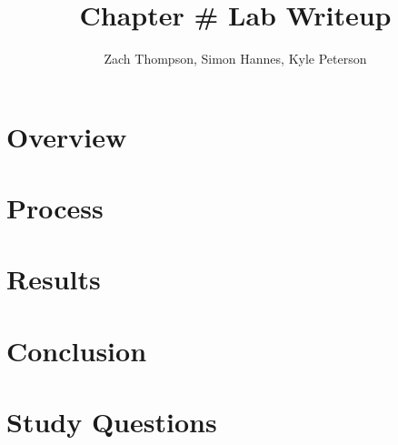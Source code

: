 \documentclass{article}
\title{Chapter # Lab Writeup}
\author{Zach Thompson, Simon Hannes, Kyle Peterson}
\begin{document}
\maketitle{}

\section*{Overview}

\section*{Process}

\section*{Results}

\section*{Conclusion}

\section*{Study Questions}
\end{document}
